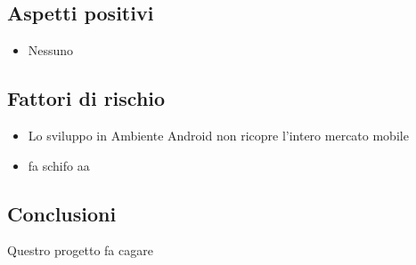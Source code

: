 \subsection{Aspetti positivi}
\begin{itemize}
    \item Nessuno
\end{itemize}
\subsection{Fattori di rischio}
\begin{itemize}
    \item Lo sviluppo in Ambiente Android non ricopre l'intero mercato mobile
    \item fa schifo aa
\end{itemize}
\subsection{Conclusioni}
Questro progetto fa cagare


